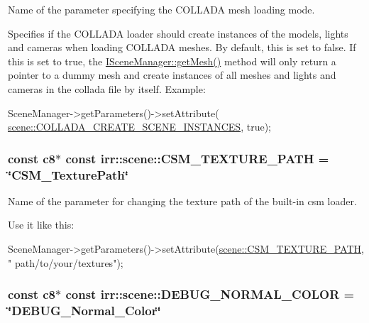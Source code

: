 Name of the parameter specifying the C\+O\+L\+L\+A\+DA mesh loading mode. 

Specifies if the C\+O\+L\+L\+A\+DA loader should create instances of the models, lights and cameras when loading C\+O\+L\+L\+A\+DA meshes. By default, this is set to false. If this is set to true, the \hyperlink{classirr_1_1scene_1_1ISceneManager_aca1b12117220849983243ee2f73a8f4d}{I\+Scene\+Manager\+::get\+Mesh()} method will only return a pointer to a dummy mesh and create instances of all meshes and lights and cameras in the collada file by itself. Example\+: 
\begin{DoxyCode}
SceneManager->getParameters()->setAttribute(
      \hyperlink{namespaceirr_1_1scene_a157681b3ef101a801ce278e6f21de946}{scene::COLLADA\_CREATE\_SCENE\_INSTANCES}, \textcolor{keyword}{true});
\end{DoxyCode}
\subsubsection[{\texorpdfstring{C\+S\+M\+\_\+\+T\+E\+X\+T\+U\+R\+E\+\_\+\+P\+A\+TH}{CSM\_TEXTURE\_PATH}}]{\setlength{\rightskip}{0pt plus 5cm}const {\bf c8}$\ast$ const irr\+::scene\+::\+C\+S\+M\+\_\+\+T\+E\+X\+T\+U\+R\+E\+\_\+\+P\+A\+TH = \char`\"{}C\+S\+M\+\_\+\+Texture\+Path\char`\"{}}\hypertarget{namespaceirr_1_1scene_aecf002b9e14bd101b455632e1c260a8d}{}\label{namespaceirr_1_1scene_aecf002b9e14bd101b455632e1c260a8d}


Name of the parameter for changing the texture path of the built-\/in csm loader. 

Use it like this\+: 
\begin{DoxyCode}
SceneManager->getParameters()->setAttribute(\hyperlink{namespaceirr_1_1scene_aecf002b9e14bd101b455632e1c260a8d}{scene::CSM\_TEXTURE\_PATH}, \textcolor{stringliteral}{"
      path/to/your/textures"});
\end{DoxyCode}
\subsubsection[{\texorpdfstring{D\+E\+B\+U\+G\+\_\+\+N\+O\+R\+M\+A\+L\+\_\+\+C\+O\+L\+OR}{DEBUG\_NORMAL\_COLOR}}]{\setlength{\rightskip}{0pt plus 5cm}const {\bf c8}$\ast$ const irr\+::scene\+::\+D\+E\+B\+U\+G\+\_\+\+N\+O\+R\+M\+A\+L\+\_\+\+C\+O\+L\+OR = \char`\"{}D\+E\+B\+U\+G\+\_\+\+Normal\+\_\+\+Color\char`\"{}}\hypertarget{namespaceirr_1_1scene_a767a12984dbf7a4f0917993d748d1350}{}\label{namespaceirr_1_1scene_a767a12984dbf7a4f0917993d748d1350}


